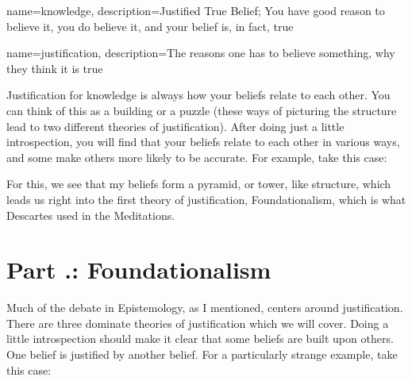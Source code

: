 {
name=knowledge,
description={Justified True Belief; You have good reason to believe it, you do believe it, and your belief is, in fact, true}
}


{
name=justification,
description={The reasons one has to believe something, why they think it is true}
}

Justification for knowledge is always how your beliefs relate to each other. You can think of this as a building or a puzzle (these ways of picturing the structure lead to two different theories of justification). After doing just a little introspection, you will find that your beliefs relate to each other in various ways, and some make others more likely to be accurate. For example, take this case:


For this, we see that my beliefs form a pyramid, or tower, like structure, which leads us right into the first theory of justification, Foundationalism, which is what Descartes used in the Meditations.

\section{Part \thechapcount.\theseccount: Foundationalism}
Much of the debate in Epistemology, as I mentioned, centers around justification. There are three dominate theories of justification which we will cover. Doing a little introspection should make it clear that some beliefs are built upon others. One belief is justified by another belief. For a particularly strange example, take this case: 



